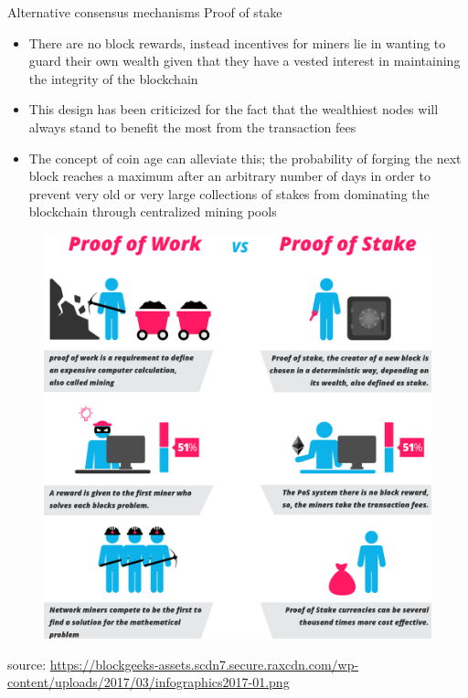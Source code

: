 \documentclass[9pt]{beamer}
\begin{document}
\begin{frame}{Alternative consensus mechanisms}
	Proof of stake
	\begin{itemize}
		\item There are no block rewards, instead incentives for miners lie in wanting to guard their own wealth given that they have a vested interest in maintaining the integrity of the blockchain
		\item This design has been criticized for the fact that the wealthiest nodes will always stand to benefit the most from the transaction fees
		\item The concept of coin age can alleviate this; the probability of forging the next block reaches a maximum after an arbitrary number of days in order to prevent very old or very large collections of stakes from dominating the blockchain through centralized mining pools
	\end{itemize}
\end{frame}


\begin{frame}
	\begin{figure}[]
		\centering
		\includegraphics  [scale=0.15]{Images/vs}
	\end{figure}
	\begin{scriptsize}
		source: \href{https://blockgeeks.com/guides/proof-of-work-vs-proof-of-stake/}{https://blockgeeks-assets.scdn7.secure.raxcdn.com/wp-content/uploads/2017/03/infographics2017-01.png}
	\end{scriptsize}
\end{frame}
\end{document}
